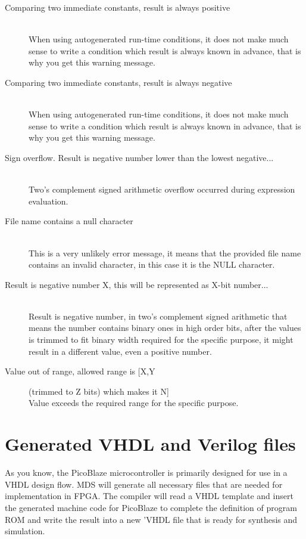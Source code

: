 \begin{description}
        \item[Comparing two immediate constants, result is always positive]~\\
            When using autogenerated run-time conditions, it does not make much sense to write a condition which result is always known in advance, that is why you get this warning message.
        \item[Comparing two immediate constants, result is always negative]~\\
            When using autogenerated run-time conditions, it does not make much sense to write a condition which result is always known in advance, that is why you get this warning message.
        \item[Sign overflow. Result is negative number lower than the lowest negative...]~\\
            Two's complement signed arithmetic overflow occurred during expression evaluation.
        \item[File name contains a null character]~\\
            This is a very unlikely error message, it means that the provided file name contains an invalid character, in this case it is the NULL character.
        \item[Result is negative number X, this will be represented as X-bit number...]~\\
            Result is negative number, in two's complement signed arithmetic that means the number contains binary ones in high order bits, after the values is trimmed to fit binary width required for the specific purpose, it might result in a different value, even a positive number.
        \item[Value out of range, allowed range is [X,Y] (trimmed to Z bits) which makes it N]~\\
            Value exceeds the required range for the specific purpose.
    \end{description}

\clearpage
\section{Generated VHDL and Verilog files}
    As you know, the PicoBlaze microcontroller is primarily designed for use in a VHDL design flow. MDS will generate all necessary files that are needed for implementation in FPGA. The compiler will read a VHDL template and insert the generated machine code for PicoBlaze to complete the definition of program ROM and write the result into a new 'VHDL file that is ready for synthesis and simulation.

